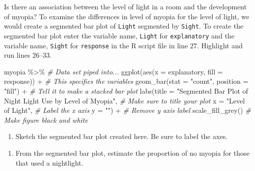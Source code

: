 \documentclass[
]{report}
\newenvironment{Shaded}{\begin{snugshade}}{\end{snugshade}}
\newcommand{\AttributeTok}[1]{\textcolor[rgb]{0.77,0.63,0.00}{#1}}
\newcommand{\CommentTok}[1]{\textcolor[rgb]{0.56,0.35,0.01}{\textit{#1}}}
\newcommand{\FunctionTok}[1]{\textcolor[rgb]{0.00,0.00,0.00}{#1}}
\newcommand{\NormalTok}[1]{#1}
\newcommand{\SpecialCharTok}[1]{\textcolor[rgb]{0.00,0.00,0.00}{#1}}
\newcommand{\StringTok}[1]{\textcolor[rgb]{0.31,0.60,0.02}{#1}}
\providecommand{\tightlist}{%
  \setlength{\itemsep}{0pt}\setlength{\parskip}{0pt}}
\begin{document}
Is there an association between the level of light in a room and the development of myopia? To examine the differences in level of myopia for the level of light, we would create a segmented bar plot of \texttt{Light} segmented by \texttt{Sight}. To create the segmented bar plot enter the variable name, \texttt{Light} for \texttt{explanatory} and the variable name, \texttt{Sight} for \texttt{response} in the R script file in line 27. Highlight and run lines 26--33.

\begin{Shaded}
\begin{Highlighting}[]
\NormalTok{myopia }\SpecialCharTok{\%\textgreater{}\%} \CommentTok{\# Data set piped into...}
\FunctionTok{ggplot}\NormalTok{(}\FunctionTok{aes}\NormalTok{(}\AttributeTok{x =}\NormalTok{ explanatory, }\AttributeTok{fill =}\NormalTok{ response)) }\SpecialCharTok{+}   \CommentTok{\# This specifies the variables}
  \FunctionTok{geom\_bar}\NormalTok{(}\AttributeTok{stat =} \StringTok{"count"}\NormalTok{, }\AttributeTok{position =} \StringTok{"fill"}\NormalTok{) }\SpecialCharTok{+}  \CommentTok{\# Tell it to make a stacked bar plot}
  \FunctionTok{labs}\NormalTok{(}\AttributeTok{title =} \StringTok{"Segmented Bar Plot of Night Light Use by Level of Myopia"}\NormalTok{,  }
       \CommentTok{\# Make sure to title your plot }
       \AttributeTok{x =} \StringTok{"Level of Light"}\NormalTok{,   }\CommentTok{\# Label the x axis}
       \AttributeTok{y =} \StringTok{""}\NormalTok{) }\SpecialCharTok{+}  \CommentTok{\# Remove y axis label}
    \FunctionTok{scale\_fill\_grey}\NormalTok{()  }\CommentTok{\# Make figure black and white}
\end{Highlighting}
\end{Shaded}

\begin{enumerate}
\def\labelenumi{\arabic{enumi}.}
\setcounter{enumi}{5}
\tightlist
\item
  Sketch the segmented bar plot created here. Be sure to label the axes.
\end{enumerate}

\vspace{2in}

\begin{enumerate}
\def\labelenumi{\arabic{enumi}.}
\setcounter{enumi}{6}
\tightlist
\item
  From the segmented bar plot, estimate the proportion of no myopia for those that used a nightlight.
\end{enumerate}
\end{document}
